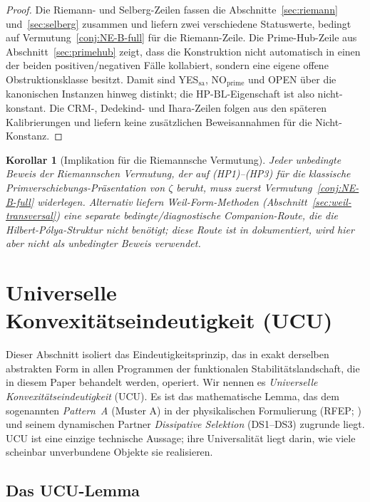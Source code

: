 \documentclass[11pt]{article}
\newtheorem{corollary}[theorem]{Korollar}
\theoremstyle{definition}
\theoremstyle{remark}
\newcommand{\HBL}{\mathrm{HP\text{-}BL}}
\begin{document}
\begin{proof}
Die Riemann- und Selberg-Zeilen fassen die Abschnitte~\ref{sec:riemann}
und~\ref{sec:selberg} zusammen und liefern zwei verschiedene Statuswerte,
bedingt auf Vermutung~\ref{conj:NE-B-full} für die Riemann-Zeile. Die
Prime-Hub-Zeile aus Abschnitt~\ref{sec:primehub} zeigt, dass die
Konstruktion nicht automatisch in einen der beiden positiven/negativen Fälle
kollabiert, sondern eine eigene offene Obstruktionsklasse besitzt. Damit sind
YES$_{\mathrm{sa}}$, NO$_{\mathrm{prime}}$ und OPEN über die kanonischen
Instanzen hinweg distinkt; die $\HBL$-Eigenschaft ist also nicht-konstant.
Die CRM-, Dedekind- und Ihara-Zeilen folgen aus den späteren Kalibrierungen und
liefern keine zusätzlichen Beweisannahmen für die Nicht-Konstanz.
\end{proof}

\begin{corollary}[Implikation für die Riemannsche Vermutung]
\label{cor:rh-consequence}
Jeder unbedingte Beweis der Riemannschen Vermutung, der auf
(HP1)--(HP3) für die klassische Primverschiebungs-Präsentation von $\zeta$ beruht, muss zuerst
Vermutung~\ref{conj:NE-B-full} widerlegen. Alternativ liefern
Weil-Form-Methoden (Abschnitt~\ref{sec:weil-transversal}) eine separate
bedingte/diagnostische Companion-Route, die die Hilbert-P\'olya-Struktur
nicht benötigt; diese Route ist in \cite{Geiger2026RHII} dokumentiert,
wird hier aber nicht als unbedingter Beweis verwendet.
\end{corollary}

\section{Universelle Konvexitätseindeutigkeit (UCU)}
\label{sec:ucu}

Dieser Abschnitt isoliert das Eindeutigkeitsprinzip, das in exakt
derselben abstrakten Form in allen Programmen der funktionalen Stabilitätslandschaft,
die in diesem Paper behandelt werden, operiert. Wir nennen es
\emph{Universelle Konvexitätseindeutigkeit} (UCU). Es ist das
mathematische Lemma, das dem sogenannten \emph{Pattern~A} (Muster A) in
der physikalischen Formulierung (RFEP; \cite{RFEPFramework}) und seinem
dynamischen Partner \emph{Dissipative Selektion} (DS1--DS3) zugrunde liegt.
UCU ist eine einzige technische Aussage; ihre Universalität liegt darin,
wie viele scheinbar unverbundene Objekte sie realisieren.

\subsection{Das UCU-Lemma}
\label{sec:ucu-lemma}
\end{document}
